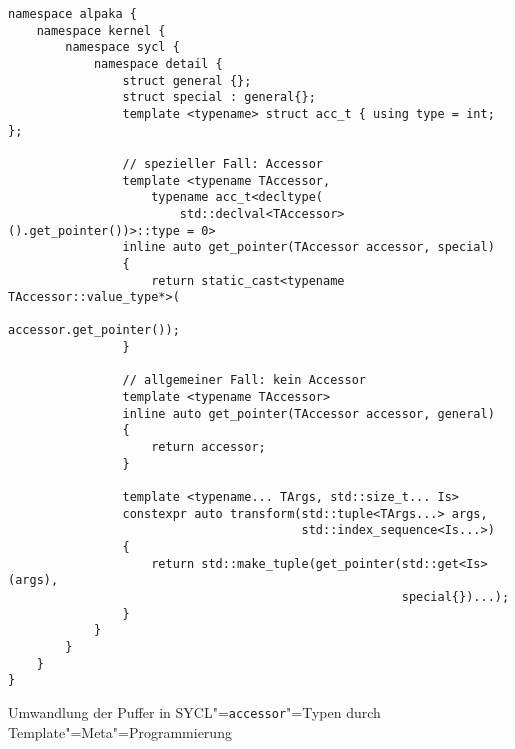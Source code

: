\begin{code}
    \begin{verbatim}
namespace alpaka {
    namespace kernel {
        namespace sycl {
            namespace detail {
                struct general {};
                struct special : general{};
                template <typename> struct acc_t { using type = int; };

                // spezieller Fall: Accessor
                template <typename TAccessor,
                    typename acc_t<decltype(
                        std::declval<TAccessor>().get_pointer())>::type = 0>
                inline auto get_pointer(TAccessor accessor, special)
                {
                    return static_cast<typename TAccessor::value_type*>(
                                                    accessor.get_pointer());
                }

                // allgemeiner Fall: kein Accessor
                template <typename TAccessor>
                inline auto get_pointer(TAccessor accessor, general)
                {
                    return accessor;
                }

                template <typename... TArgs, std::size_t... Is>
                constexpr auto transform(std::tuple<TArgs...> args,
                                         std::index_sequence<Is...>)
                {
                    return std::make_tuple(get_pointer(std::get<Is>(args),
                                                       special{})...);
                }
            }
        }
    }
}
    \end{verbatim}
    \caption{Umwandlung der Puffer in SYCL"=\texttt{accessor}"=Typen durch
             Template"=Meta"=Programmierung}
    \label{implementierung:besonderheiten:zeiger:acctrans}
\end{code}

